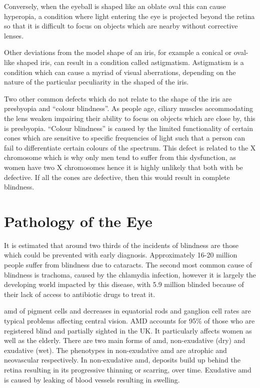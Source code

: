 Conversely, when the eyeball is shaped like an oblate oval this can
cause hyperopia, a condition where light entering the eye is projected
beyond the retina so that it is difficult to focus on objects which are
nearby without corrective lenses.

Other deviations from the model shape of an iris, for example a
conical or oval-like shaped iris, can result in a condition called
astigmatism. Astigmatism is a condition which can cause  a myriad
of visual aberrations, depending on the nature of the particular
peculiarity in the shaped of the iris.

Two other common defects which do not relate to the shape of the
iris are presbyopia and \enquote{colour blindness}. As people age,
ciliary muscles accommodating the  lens weaken impairing their ability
to focus on objects which are close by, this is presbyopia.\cite{fisher1985ciliary}
\enquote{Colour blindness} is caused by the limited functionality of
certain cones which are sensitive to specific frequencies of light such that
a person can fail to differentiate certain colours of the spectrum. This
defect is related to the X chromosome which is why only men tend to
suffer from this dysfunction, as women have two X chromosomes hence
it is highly unlikely that both with be defective.\cite{george1996clinical}
If all the cones are defective, then this would result in complete blindness.

\section{Pathology of the Eye}

It is estimated that around two thirds of the incidents of blindness are those
which could be prevented with early diagnosis.\cite{west2000looking}
Approximately 16-20 million people suffer from blindness due to
cataracts.\cite{west2000looking} The second most common cause of
blindness is trachoma, caused by the chlamydia infection, however it is
largely the developing world impacted by this disease, with 5.9 million
blinded because of their lack of access to antibiotic drugs to treat it.
\cite{west2000looking}

\Gls{amd} of pigment cells and decreases in equatorial rods and ganglion
cell rates are typical problems affecting central vision.
\cite{gao1992aging} AMD accounts for 95\% of those who are
registered blind and partially sighted in the UK. It particularly
affects women as well as the elderly.
\cite{o1998age,klein2005complement,west2000looking}
There are two main forms of \acrshort{amd}, non-exudative
(dry) and exudative (wet). The phenotypes in non-exudative
\acrshort{amd} are atrophic and neovascular respectively.
\cite{kuno2011dry} In non-exudative \acrshort{amd}, deposits
build up behind the retina resulting in its progressive thinning or
scarring, over time. Exudative \acrshort{amd} is caused by leaking
of blood vessels resulting in swelling.


